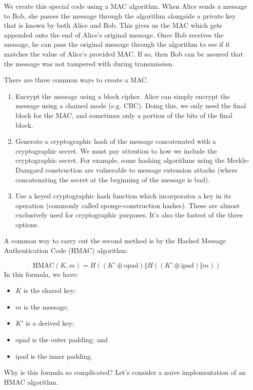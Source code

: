 We create this special code using a MAC algorithm. When Alice sends a message to Bob, she passes the message through the algorithm alongside a private key that is known by both Alice and Bob. This gives us the MAC which gets appended onto the end of Alice's original message. Once Bob receives the message, he can pass the original message through the algorithm to see if it matches the value of Alice's provided MAC. If so, then Bob can be assured that the message was not tampered with during transmission.

There are three common ways to create a MAC.
\begin{enumerate}
    \item Encrypt the message using a block cipher. Alice can simply encrypt the message using a chained mode (e.g. CBC). Doing this, we only need the final block for the MAC, and sometimes only a portion of the bits of the final block.
    \item Generate a cryptographic hash of the message concatenated with a cryptographic secret. We must pay attention to how we include the cryptographic secret. For example, some hashing algorithms using the Merkle-Damgard construction are vulnerable to message extension attacks (where concatenating the secret at the beginning of the message is bad).
    \item Use a keyed cryptographic hash function which incorporates a key in its operation (commonly called sponge-construction hashes). These are almost exclusively used for cryptographic purposes. It's also the fastest of the three options.
\end{enumerate}

A common way to carry out the second method is by the Hashed Message Authentication Code (HMAC) algorithm:

\[ \text{HMAC}(K, m) = H \left( (K\prime \oplus \text{opad}) \mathrel{\Vert} H \left( (K \prime \oplus \text{ipad}) \mathrel{\Vert} m \right) \right) \]
In this formula, we have:
\begin{itemize}[noitemsep]
    \item $K$ is the shared key;
    \item $m$ is the message;
    \item $K\prime$ is a derived key;
    \item opad is the outer padding; and
    \item ipad is the inner padding.
\end{itemize}

Why is this formula so complicated? Let's consider a naive implementation of an HMAC algorithm.

